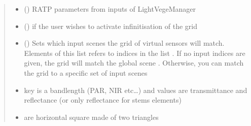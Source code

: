 \documentclass[letterpaper,10pt,english]{sphinxmanual}
\begin{document}
\begin{fulllineitems}
\begin{quote}
\begin{description}
\begin{itemize}
\item {} 
\sphinxAtStartPar
{} () \textendash{} RATP parameters from inputs of LightVegeManager

\item {} 
\sphinxAtStartPar
{} () \textendash{} if the user wishes to activate infinitisation of the grid

\item {} 
\sphinxAtStartPar
{} () \textendash{} Sets which input scenes the grid of virtual sensors will match. 
Elements of this list refers to indices in the list .
If no input indices are given, the grid will match the global scene . 
Otherwise, you can match the grid to a specific set of input scenes

\end{itemize}

\sphinxAtStartPar
\begin{itemize}
\item {} \begin{description}
\sphinxAtStartPar
key is a bandlength (PAR, NIR etc…) and values are transmittance and reflectance
(or only reflectance for stems elements)

\end{description}

\item {} \begin{description}
\sphinxAtStartPar
are horizontal square made of two triangles

\begin{sphinxVerbatim}[commandchars=\\\{\}]
     \PYG{p}{[} \PYG{p}{]} 
\end{sphinxVerbatim}


\end{description}
\end{itemize}
\end{description}
\end{quote}
\end{fulllineitems}
\end{document}
